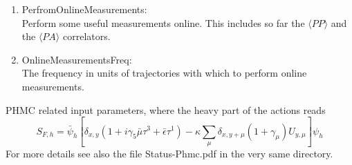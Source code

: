 \begin{enumerate}
\item {\ttfamily PerfromOnlineMeasurements}:\\
  Perform some useful measurements online. This includes so far the
  $\langle PP\rangle$ and the $\langle PA\rangle$ correlators.

\item {\ttfamily OnlineMeasurementsFreq}:\\
  The frequency in units of trajectories with which to perform online
  measurements. 

\end{enumerate}

\noindent PHMC related input parameters, where the heavy part of the actions
reads
\begin{equation}
  \label{eq:haction}
  S_{F,h} = \bar\psi_h\left[ \delta_{x,y}(1+i\gamma_5\bar\mu\tau^3 +
    \bar\epsilon\tau^1)
  - \kappa\sum_\mu \delta_{x,y+\mu}(1+\gamma_\mu)U_{y,\mu}\right] \psi_h
\end{equation}
For more details see also the file {\ttfamily Status-Phmc.pdf} in the
very same directory.
